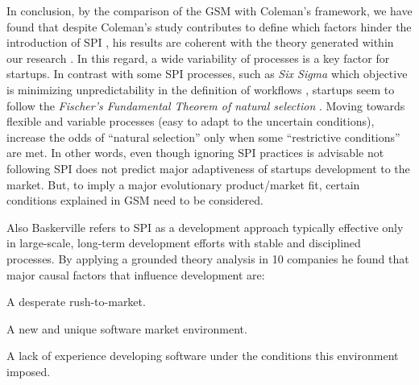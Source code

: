 \documentclass[10pt,journal,letterpaper,compsoc]{IEEEtran}
\begin{document}
In conclusion, by the comparison of the GSM with Coleman's framework, we have 
found that despite Coleman's study contributes to define which factors hinder 
the introduction of SPI %
, his results are coherent with the theory generated within our research %
. In this regard, a wide variability of processes is a key factor for startups. 
In contrast with some SPI processes, such as \textit{Six Sigma} which objective 
is minimizing unpredictability in the definition of workflows \cite{Sixsigma}, 
startups seem to follow the \textit{Fischer's Fundamental Theorem of natural 
selection} \cite{Fisher}. Moving towards flexible and variable processes (easy 
to adapt to the uncertain conditions), increase the odds of ``natural 
selection'' only when some ``restrictive conditions'' are met. In other words, 
even though ignoring SPI practices is advisable %
not following SPI does not predict major adaptiveness of startups development 
to the market. But, to imply a major evolutionary product/market fit, certain 
conditions explained in GSM need to be considered. 

Also Baskerville \cite{Internet} refers to SPI as a development approach 
typically effective only in large-scale, long-term development efforts with 
stable and disciplined processes. By applying a grounded theory analysis in 10 
companies he found that major causal factors that influence development are: 


\begin{compactenum}

\item A desperate rush-to-market.
\item A new and unique software market environment.
\item A lack of experience developing software under the conditions this 
environment imposed.


\end{compactenum}
\end{document}
